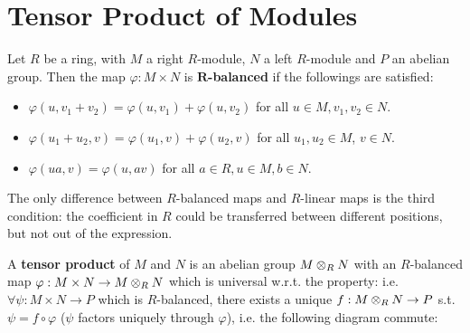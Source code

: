 \documentclass{article}
\begin{document}

\tableofcontents
\newpage

\section{Tensor Product of Modules}

\begin{definition}
    Let $R$ be a ring, with $M$ a right $R$-module, $N$ a left $R$-module and $P$ an abelian group. Then the map $\varphi: M \times N$ is \textbf{$\mathbf{R}$-balanced} if the followings are satisfied:
    \begin{itemize}
        \item $\varphi(u, v_1 + v_2) = \varphi(u, v_1) + \varphi(u, v_2)$ for all $u\in M, v_1, v_2 \in N$.
        \item $\varphi(u_1 + u_2, v) = \varphi(u_1, v) + \varphi(u_2, v)$ for all $u_1, u_2 \in M$, $v \in N$.
        \item $\varphi(ua, v) = \varphi(u, av)$ for all $a \in R, u\in M, b\in N$.
    \end{itemize}
\end{definition}

\begin{remark}
    The only difference between $R$-balanced maps and $R$-linear maps is the third condition: the coefficient in $R$ could be transferred between different positions, but not out of the expression.
\end{remark}

\begin{definition}
    A \textbf{tensor product} of $M$ and $N$ is an abelian group $M \otimes_R N$ with an $R$-balanced map $\varphi: M \times N \to M \otimes_R N$ which is universal w.r.t. the property: i.e. $\forall \psi: M \times N \to P$ which is $R$-balanced, there exists a unique $f: M \otimes_R N \to P$ s.t. $\psi = f \circ \varphi$ ($\psi$ factors uniquely through $\varphi$), i.e. the following diagram commute:
    \begin{figure}[htbp]
        \centering
    \end{figure}
\end{definition}
\end{document}
